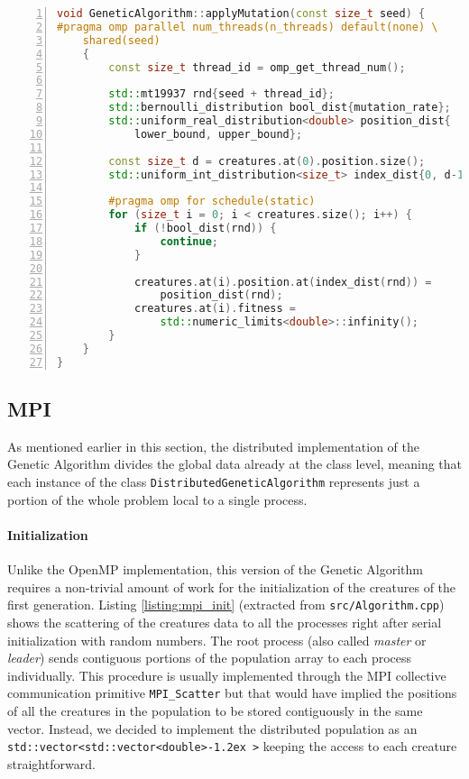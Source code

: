 \documentclass[12pt,a4paper,oneside]{article}
\newcommand{\rrangle}{>\kern-1.2ex~>\xspace}
\begin{document}
	\begin{lstlisting}[language=C++,
		directivestyle={\color{black}},
		backgroundcolor=\color{lgrey},
    	basicstyle=\footnotesize \ttfamily \color{black} \bfseries,
		numbers=left,
		numbersep=5pt,
    	numberstyle=\tiny\color{black},
		commentstyle=\color{dkgreen},
    	rulecolor=\color{black},
    	keywordstyle=\color{purple},
    	morekeywords={size_t,std},
		tabsize=2,
    	captionpos=b,
    	caption={Parallel mutation phase in OpenMP.},
    	label={listing:omp_mutation}
	   ]
void GeneticAlgorithm::applyMutation(const size_t seed) {
#pragma omp parallel num_threads(n_threads) default(none) \
	shared(seed)
	{
		const size_t thread_id = omp_get_thread_num();

		std::mt19937 rnd{seed + thread_id};
		std::bernoulli_distribution bool_dist{mutation_rate};
		std::uniform_real_distribution<double> position_dist{
			lower_bound, upper_bound};

		const size_t d = creatures.at(0).position.size();
		std::uniform_int_distribution<size_t> index_dist{0, d-1};

		#pragma omp for schedule(static)
		for (size_t i = 0; i < creatures.size(); i++) {
			if (!bool_dist(rnd)) {
				continue;
			}

			creatures.at(i).position.at(index_dist(rnd)) =
				position_dist(rnd);
			creatures.at(i).fitness =
				std::numeric_limits<double>::infinity();
		}
	}
}
	\end{lstlisting}

	\subsection{MPI}
	As mentioned earlier in this section, the distributed implementation of the Genetic Algorithm divides the global data already at the class level, meaning that each instance of the class \texttt{DistributedGeneticAlgorithm} represents just a portion of the whole problem local to a single process.

	\paragraph{Initialization}
	Unlike the OpenMP implementation, this version of the Genetic Algorithm requires a non-trivial amount of work for the initialization of the creatures of the first generation.
	Listing \ref{listing:mpi_init} (extracted from \texttt{src/Algorithm.cpp}) shows the scattering of the creatures data to all the processes right after serial initialization with random numbers.
	The root process (also called \textit{master} or \textit{leader}) sends contiguous portions of the population array to each process individually.
	This procedure is usually implemented through the MPI collective communication primitive \texttt{MPI\_Scatter} but that would have implied the positions of all the creatures in the population to be stored contiguously in the same vector.
	Instead, we decided to implement the distributed population as an \texttt{std::vector<std::vector<double\rrangle} keeping the access to each creature straightforward.
\end{document}

